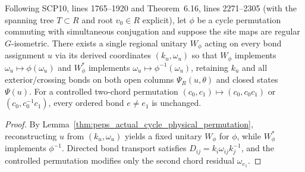 \begin{lemma}
    \label{thm:peps_actual_bidirectional_cycle_operation}
    \leanok
    Following SCP10, lines 1765--1920 and Theorem~6.16, lines 2271--2305
    (with the spanning tree $T\subset R$ and root $v_0\in R$ explicit), let $\phi$ be a cycle
    permutation commuting with simultaneous conjugation and suppose the site maps are regular $G$-isometric.
    There exists a single regional unitary $W_\phi$ acting on every bond assignment $u$ via its derived coordinates $(k_u,\omega_u)$ so that $W_\phi$ implements $\omega_u\mapsto\phi(\omega_u)$ and $W_\phi^*$ implements $\omega_u\mapsto\phi^{-1}(\omega_u)$, retaining $k_u$ and all exterior/crossing bonds on both open columns $\Psi_R(u,\theta)$ and closed states $\Psi(u)$.
    For a controlled two-chord permutation $(c_0,c_1)\mapsto(c_0,c_0c_1)$ or $(c_0,c_0^{-1}c_1)$, every ordered bond $e\neq e_1$ is unchanged.
\end{lemma}
\begin{proof}\leanok
    By Lemma~\ref{thm:peps_actual_cycle_physical_permutation}, reconstructing $u$ from $(k_u,\omega_u)$ yields a fixed unitary $W_\phi$ for $\phi$, while $W_\phi^*$ implements $\phi^{-1}$.
    Directed bond transport satisfies $D_{ij}=k_i\omega_{ij}k_j^{-1}$, and the controlled permutation modifies only the second chord residual $\omega_{e_1}$.
\end{proof}

